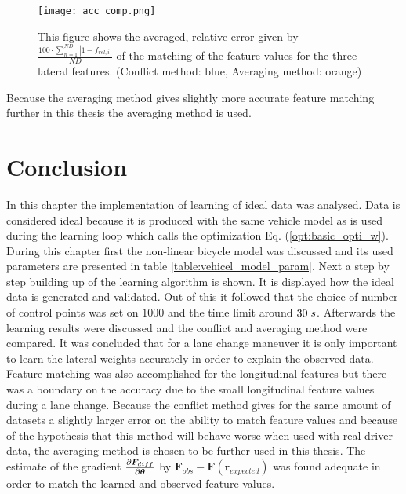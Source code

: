 \begin{figure}[h!]
	\centering
	\texttt{[image: acc\_comp.png]}
	\caption{This figure shows the averaged, relative error given by $\frac{100\cdot\sum_{n=1}^{ND}|1-f_{rel,i}|}{ND}$ of the matching of the feature values for the three lateral features. (Conflict method: blue, Averaging method: orange)}
	\label{fig:acc_comp}
\end{figure}

Because the averaging method gives slightly more accurate feature matching further in this thesis the averaging method is used.

 
 \section{Conclusion} \label{s:conclusion_cha4}
In this chapter the implementation of learning of ideal data was analysed. Data is considered ideal because it is produced with the same vehicle model as is used during the learning loop which calls the optimization Eq. (\ref{opt:basic_opti_w}). During this chapter first the non-linear bicycle model was discussed and its used parameters are presented in table \ref{table:vehicel_model_param}. Next a step by step building up of the learning algorithm is shown. It is displayed how the ideal data is generated and validated. Out of this it followed that the choice of number of control points was set on $1000$ and the time limit around $30 \hspace{1mm}s$. Afterwards the learning results were discussed and the conflict and averaging method were compared. It was concluded that for a lane change maneuver it is only important to learn the lateral weights accurately in order to explain the observed data. Feature matching was also accomplished for the longitudinal features but there was a boundary on the accuracy due to the small longitudinal feature values during a lane change. Because the conflict method gives for the same amount of datasets a slightly larger error on the ability to match feature values and because of the hypothesis that this method will behave worse when used with real driver data, the averaging method is chosen to be further used in this thesis. The estimate of the gradient $\pdv{\bm{F}_{diff}}{\bm{\theta}}$ by $\bm{F}_{obs} - \bm{F}(\bm{r}_{expected})$ was found adequate in order to match the learned and observed feature values.




